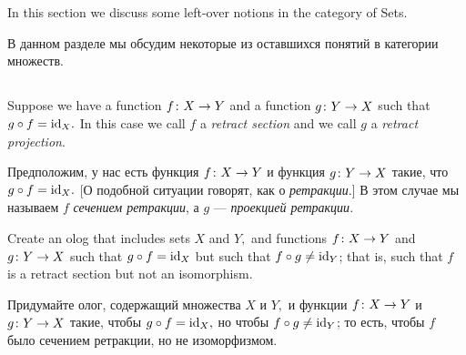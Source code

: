 \documentclass[CT4S-EN-RU]{subfiles}
\begin{document}
\section{}

\begin{blockENG}
In this section we discuss some left-over notions in the category of Sets.
\end{blockENG}

\begin{blockRUS}
В данном разделе мы обсудим некоторые из оставшихся понятий в категории множеств. 
\end{blockRUS}


\subsection{}

\begin{definitionENG}
Suppose we have a function $f\colon X\rightarrow Y$ and a function $g\colon Y\rightarrow X$ such that $g\circ f=\textnormal{id}_X.$ In this case we call $f$ a {\em retract section} and we call $g$ a {\em retract projection}. 
\end{definitionENG}

\begin{definitionRUS}
Предположим, у нас есть функция $f\colon X\rightarrow Y$ и функция $g\colon Y\rightarrow X$ такие, что $g\circ f=\textnormal{id}_X.$ [О подобной ситуации говорят, как о {\em ретракции}.] В этом случае мы называем $f$ {\em сечением ретракции}, а $g$ — {\em проекцией ретракции}.
\end{definitionRUS}

\begin{exerciseENG}
Create an olog that includes sets $X$ and $Y,$ and functions $f\colon X\rightarrow Y$ and $g\colon Y\rightarrow X$ such that $g\circ f=\textnormal{id}_X$ but such that $f\circ g\neq\textnormal{id}_Y$; that is, such that $f$ is a retract section but not an isomorphism.
\end{exerciseENG}

\begin{exerciseRUS}
Придумайте олог, содержащий множества $X$ и $Y,$ и функции $f\colon X\rightarrow Y$ и $g\colon Y\rightarrow X$ такие, чтобы $g\circ f=\textnormal{id}_X,$ но чтобы $f\circ g\neq\textnormal{id}_Y$; то есть, чтобы $f$ было сечением ретракции, но не изоморфизмом.
\end{exerciseRUS}
\end{document}
